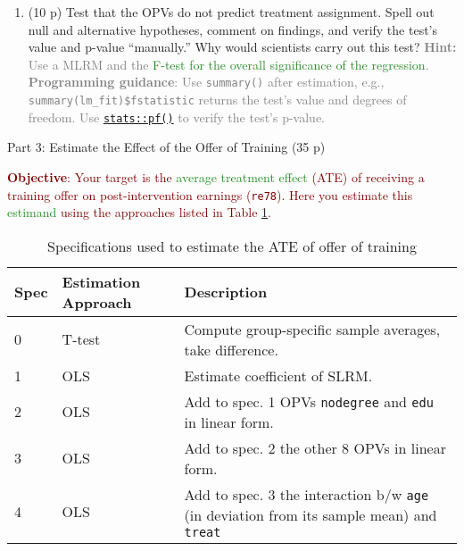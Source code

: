 \documentclass{article}
\begin{document}
\begin{enumerate}[label=\textbf{Q\arabic{enumi}}.,ref=Q\arabic{enumi}, wide=0pt, itemsep=1em, topsep=5pt]
\item (10 p) Test that the OPVs do not predict treatment assignment.  Spell out null and alternative hypotheses, comment on findings, and verify the test's value and p-value ``manually.'' Why would scientists carry out this test? \textcolor{gray}{\textbf{Hint:} Use a MLRM and the \textcolor{ForestGreen}{F-test for the overall significance of the regression}. \textbf{Programming guidance}: Use \texttt{summary()} after estimation, e.g., \texttt{summary(lm\_fit)\$fstatistic} returns the test's value and degrees of freedom. Use \href{https://stat.ethz.ch/R-manual/R-devel/library/stats/html/Fdist.html}{\texttt{stats::pf()}} to verify the test's p-value.}\label{item:balance_test:predict_treat} 
\end{enumerate}

\begin{center}
{\LARGE Part 3: Estimate the Effect of the Offer of Training (35 p)}
\end{center}

\noindent \textcolor{Maroon}{\textbf{Objective}: Your target is the \textcolor{ForestGreen}{average treatment effect} (ATE) of receiving a training offer on post-intervention earnings (\texttt{re78}). Here you estimate this \textcolor{ForestGreen}{estimand} using the approaches listed in Table \ref{tab:ate-specs}.
\begin{table}[h]
\centering
\begin{tabular}{|l|l|l|}
\hline
\textbf{Spec} & \textbf{Estimation Approach} & \textbf{Description} \\ \hline
0 & T-test & Compute group-specific sample averages, take difference. \\ \hline
1 & OLS & Estimate coefficient of SLRM. \\ \hline
2 & OLS & Add to spec. 1 OPVs \texttt{nodegree} and \texttt{edu} in linear form. \\ \hline
3 & OLS & Add to spec. 2 the other 8 OPVs in linear form. \\ \hline
4 & OLS & Add to spec. 3 the interaction b/w \texttt{age} (in deviation from its sample mean) and \texttt{treat} \\ \hline
\end{tabular}
\caption{Specifications used to estimate the ATE of offer of training}
\label{tab:ate-specs}
\end{table}
}
\end{document}
